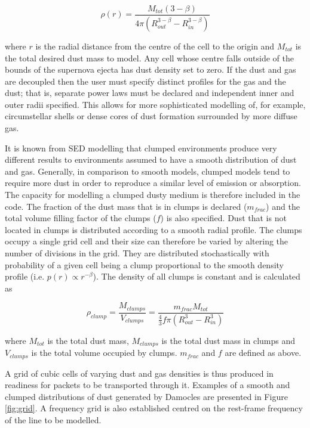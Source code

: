 \begin{equation}
\rho (r)= \frac{M_{tot}(3-\beta)}{4\pi (R_{out}^{3-\beta}-R_{in}^{3-\beta})}
\end{equation}
	
	
\noindent where $r$ is the radial distance from the centre of the cell to the origin and $M_{tot}$ is the total desired dust mass to model.  Any cell whose centre falls outside of the bounds of the supernova ejecta has dust density set to zero.  If the dust and gas are decoupled then the user must specify distinct profiles for the gas and the dust; that is, separate power laws must be declared and independent inner and outer radii specified.  This allows for more sophisticated modelling of, for example, circumstellar shells or dense cores of dust formation surrounded by more diffuse gas.

It is known from SED modelling that clumped environments produce very different results to environments assumed to have a smooth distribution of dust and gas.  Generally, in comparison to smooth models, clumped models tend to require more dust in order to reproduce a similar level of emission or absorption.  The capacity for modelling a clumped dusty medium is therefore included in the code.  The fraction of the dust mass that is in clumps is declared ($m_{frac}$) and the total volume filling factor of the clumps ($f$) is also specified.  Dust that is not located in clumps is distributed according to a smooth radial profile.  The clumps occupy  a single grid cell and their size can therefore be varied by altering the number of divisions in the grid.  They are distributed stochastically with probability of a given cell being a clump proportional to the smooth density profile (i.e. $p(r) \propto r^{-\beta}$).  The density of all clumps is constant and is calculated as 

\begin{equation}
\rho_{clump}=\frac{M_{clumps}}{V_{clumps}}=\frac{m_{frac}M_{tot}}{\frac{4}{3} f\pi (R_{out}^{3}-R_{in}^{3} )}
\end{equation}

\noindent where $M_{tot}$ is the total dust mass, $M_{clumps}$ is the total dust mass in clumps and $V_{clumps}$ is the total volume occupied by clumps.  $m_{frac}$ and $f$ are defined as above.
	
A grid of cubic cells of varying dust and gas densities is thus produced in readiness for packets to be transported through it.  Examples of a smooth and clumped distributions of dust generated by Damocles are presented in Figure \ref{fig:grid}.  A frequency grid is also established centred on the rest-frame frequency of the line to be modelled.

